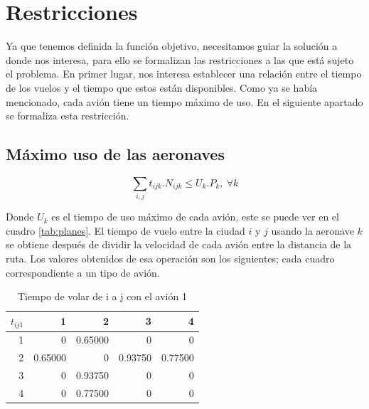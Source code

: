 \documentclass[12pt]{article}
\begin{document}
\section{Restricciones}

Ya que tenemos definida la función objetivo, necesitamos guiar la solución a donde nos interesa, para ello se formalizan las restricciones a las que está sujeto el problema. En primer lugar, nos interesa establecer una relación entre el tiempo de los vuelos y el tiempo que estos están disponibles. Como ya se había mencionado, cada avión tiene un tiempo máximo de uso. En el siguiente apartado se formaliza esta restricción.

\subsection{Máximo uso de las aeronaves}

\begin{equation}
    \sum_{i,j} t_{ijk}.N_{ijk} \leq U_{k}.P_{k},\ \forall k
\end{equation}

Donde $U_k$ es el tiempo de uso máximo de cada avión, este se puede ver en el cuadro \ref{tab:planes}. El tiempo de vuelo entre la ciudad $i$ y $j$ usando la aeronave $k$ se obtiene después de dividir la velocidad de cada avión entre la distancia de la ruta. Los valores obtenidos de esa operación son los siguientes; cada cuadro correspondiente a un tipo de avión.

\newpage

\begin{table}[ht!]
    \centering
    \begin{tabular}{r|r|r|r|r}
        $t_{ij1}$%
               &   1  &   2  &   3  &   4\\
            \hline
            \hline
             1 &       0  & 0.65000  &       0  &       0\\
             2 & 0.65000  &       0  & 0.93750  & 0.77500\\
             3 &       0  & 0.93750  &       0  &       0\\
             4 &       0  & 0.77500  &       0  &       0\\
    \end{tabular}
    \caption{Tiempo de volar de i a j con el avión 1}
    \label{tab:tij1}
\end{table}
\end{document}
